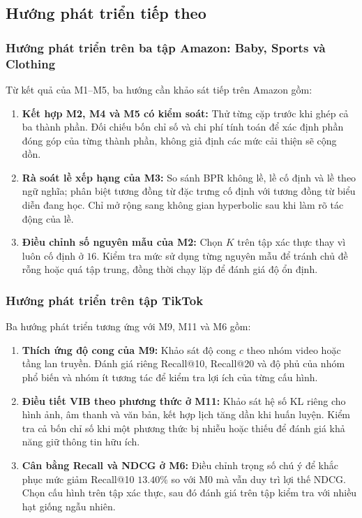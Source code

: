 \subsection{Hướng phát triển tiếp theo}
\label{sec:negcl_m1_m5_future}

\subsubsection{Hướng phát triển trên ba tập Amazon: Baby, Sports và Clothing}
\label{sec:negcl_future_amazon}


Từ kết quả của M1--M5, ba hướng cần khảo sát tiếp trên Amazon gồm:
\begin{enumerate}[leftmargin=*, label=\textbf{\arabic*.}]
  \item \textbf{Kết hợp M2, M4 và M5 có kiểm soát:} Thử từng cặp trước khi ghép cả ba thành phần. Đối chiếu bốn chỉ số và chi phí tính toán để xác định phần đóng góp của từng thành phần, không giả định các mức cải thiện sẽ cộng dồn.
  \item \textbf{Rà soát lề xếp hạng của M3:} So sánh BPR không lề, lề cố định và lề theo ngữ nghĩa; phân biệt tương đồng từ đặc trưng cố định với tương đồng từ biểu diễn đang học. Chỉ mở rộng sang không gian hyperbolic sau khi làm rõ tác động của lề.
  \item \textbf{Điều chỉnh số nguyên mẫu của M2:} Chọn $K$ trên tập xác thực thay vì luôn cố định ở $16$. Kiểm tra mức sử dụng từng nguyên mẫu để tránh chủ đề rỗng hoặc quá tập trung, đồng thời chạy lặp để đánh giá độ ổn định.
\end{enumerate}

\subsubsection{Hướng phát triển trên tập TikTok}
\label{sec:negcl_future_tiktok}

Ba hướng phát triển tương ứng với M9, M11 và M6 gồm:
\begin{enumerate}[leftmargin=*, label=\textbf{\arabic*.}]
  \item \textbf{Thích ứng độ cong của M9:} Khảo sát độ cong $c$ theo nhóm video hoặc tầng lan truyền. Đánh giá riêng Recall@10, Recall@20 và độ phủ của nhóm phổ biến và nhóm ít tương tác để kiểm tra lợi ích của từng cấu hình.
  \item \textbf{Điều tiết VIB theo phương thức ở M11:} Khảo sát hệ số KL riêng cho hình ảnh, âm thanh và văn bản, kết hợp lịch tăng dần khi huấn luyện. Kiểm tra cả bốn chỉ số khi một phương thức bị nhiễu hoặc thiếu để đánh giá khả năng giữ thông tin hữu ích.
  \item \textbf{Cân bằng Recall và NDCG ở M6:} Điều chỉnh trọng số chú ý để khắc phục mức giảm Recall@10 $13.40\%$ so với M0 mà vẫn duy trì lợi thế NDCG. Chọn cấu hình trên tập xác thực, sau đó đánh giá trên tập kiểm tra với nhiều hạt giống ngẫu nhiên.
\end{enumerate}

